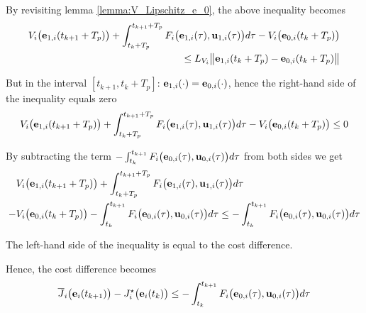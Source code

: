 \begin{gg_box}
  By revisiting lemma \eqref{lemma:V_Lipschitz_e_0}, the above inequality
  becomes
  \begin{align}
    V_i\big(\bm{\mathbf{e}}_{1,i}(t_{k+1} + T_p)\big)
    + \int_{t_k + T_p}^{t_{k+1} + T_p} F_i\big(\bm{\mathbf{e}}_{1,i}(\tau), \bm{\mathbf{u}}_{1,i}(\tau)\big) d\tau
    - V_i\big(\bm{\mathbf{e}}_{0,i}(t_k + T_p)\big) \\
    \leq L_{V_i} \big\|\bm{\mathbf{e}}_{1,i}(t_k + T_p) - \bm{\mathbf{e}}_{0,i}(t_k + T_p)\big\|
  \end{align}

  But in the interval $[t_{k+1}, t_k + T_p]$:
  $\bm{\mathbf{e}}_{1,i}(\cdot) = \bm{\mathbf{e}}_{0,i}(\cdot)$, hence the right-hand side
  of the inequality equals zero
  \begin{align}
    V_i\big(\bm{\mathbf{e}}_{1,i}(t_{k+1} + T_p)\big)
    + \int_{t_k + T_p}^{t_{k+1} + T_p} F_i\big(\bm{\mathbf{e}}_{1,i}(\tau), \bm{\mathbf{u}}_{1,i}(\tau)\big) d\tau
    - V_i\big(\bm{\mathbf{e}}_{0,i}(t_k + T_p)\big) \leq 0
  \end{align}

  By subtracting the term
  $-\int_{t_k}^{t_{k+1}} F_i \big(\bm{\mathbf{e}}_{0,i}(\tau), \bm{\mathbf{u}}_{0,i} (\tau)\big) d \tau$
  from both sides we get
  \begin{align}
    &V_i\big(\bm{\mathbf{e}}_{1,i}(t_{k+1} + T_p)\big)
    + \int_{t_k + T_p}^{t_{k+1} + T_p} F_i\big(\bm{\mathbf{e}}_{1,i}(\tau), \bm{\mathbf{u}}_{1,i}(\tau)\big) d\tau \\
    - &V_i\big(\bm{\mathbf{e}}_{0,i}(t_k + T_p)\big)
    -\int_{t_k}^{t_{k+1}} F_i \big(\bm{\mathbf{e}}_{0,i}(\tau), \bm{\mathbf{u}}_{0,i} (\tau)\big) d \tau
    \leq -\int_{t_k}^{t_{k+1}} F_i \big(\bm{\mathbf{e}}_{0,i}(\tau), \bm{\mathbf{u}}_{0,i} (\tau)\big) d \tau
  \end{align}

  The left-hand side of the inequality is equal to the cost difference.
\end{gg_box}

Hence, the cost difference becomes
\begin{align}
  \overline{J}_i\big(\bm{\mathbf{e}}_i(t_{k+1})\big) - J_i^{\star}\big(\bm{\mathbf{e}}_i(t_k)\big) \leq
    -\int_{t_k}^{t_{k+1}} F_i \big(\bm{\mathbf{e}}_{0,i}(\tau), \bm{\mathbf{u}}_{0,i} (\tau)\big) d \tau
\end{align}

